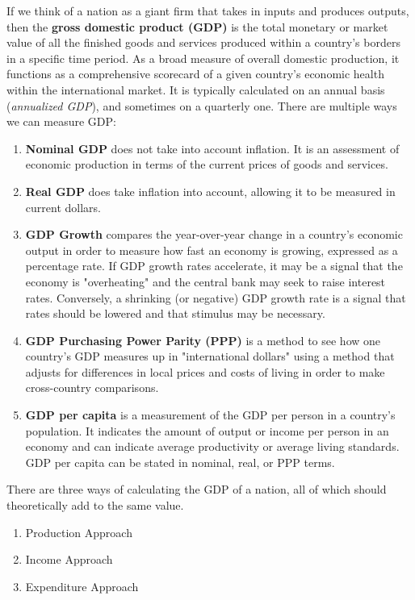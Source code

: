 \documentclass{article}
\begin{document}
    \begin{definition}
      If we think of a nation as a giant firm that takes in inputs and produces outputs, then the \textbf{gross domestic product (GDP)} is the total monetary or market value of all the finished goods and services produced within a country's borders in a specific time period. As a broad measure of overall domestic production, it functions as a comprehensive scorecard of a given country's economic health within the international market. It is typically calculated on an annual basis (\textit{annualized GDP}), and sometimes on a quarterly one. There are multiple ways we can measure GDP: 
      \begin{enumerate}
        \item \textbf{Nominal GDP} does not take into account inflation. It is an assessment of economic production in terms of the current prices of goods and services.  
        \item \textbf{Real GDP} does take inflation into account, allowing it to be measured in current dollars. 
        \item \textbf{GDP Growth} compares the year-over-year change in a country's economic output in order to measure how fast an economy is growing, expressed as a percentage rate. If GDP growth rates accelerate, it may be a signal that the economy is "overheating" and the central bank may seek to raise interest rates. Conversely, a shrinking (or negative) GDP growth rate is a signal that rates should be lowered and that stimulus may be necessary. 
        \item \textbf{GDP Purchasing Power Parity (PPP)} is a method to see how one country's GDP measures up in "international dollars" using a method that adjusts for differences in local prices and costs of living in order to make cross-country comparisons. 
        \item \textbf{GDP per capita} is a measurement of the GDP per person in a country's population. It indicates the amount of output or income per person in an economy and can indicate average productivity or average living standards. GDP per capita can be stated in nominal, real, or PPP terms. 
      \end{enumerate}
    \end{definition}

    There are three ways of calculating the GDP of a nation, all of which should theoretically add to the same value. 
    \begin{enumerate}
        \item Production Approach
        \item Income Approach
        \item Expenditure Approach
    \end{enumerate}
\end{document}
